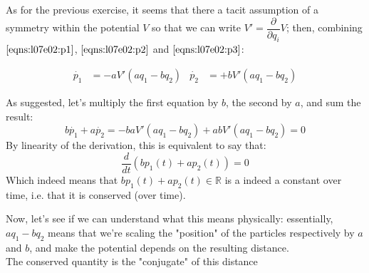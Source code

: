 \documentclass[solutions.tex]{subfiles}
\begin{document}
As for the previous exercise, it seems that there a tacit assumption
of a symmetry within the potential $V$ so that we can write
$V' = \dfrac{\partial}{\partial q_i}V$; then, combining $\eqref{eqns:l07e02:p1}$,
$\eqref{eqns:l07e02:p2}$ and $\eqref{eqns:l07e02:p3}$:

\begin{align*}
	\dot{p_1} &= -aV'(a q_1 - b q_2) &
	\dot{p_2} &= +bV'(a q_1 - b q_2)
\end{align*}

As suggested, let's multiply the first equation by $b$, the second by $a$,
and sum the result:
\[
	b\dot{p_1} + a\dot{p_2} = -baV'(a q_1 - b q_2) +abV'(a q_1 - b q_2) = 0
\]
By linearity of the derivation, this is equivalent to say that:
\[
	\frac{d}{dt}(b p_1(t) + a p_2(t)) = 0
\]
Which indeed means that $b p_1(t) + a p_2(t) \in \mathbb{R}$ is a indeed
a constant over time, i.e. that it is conserved (over time).

\hrr

Now, let's see if we can understand what this means physically: essentially,
$a q_1 - b q_2$ means that we're scaling the "position" of the particles
respectively by $a$ and $b$, and make the potential depends on the resulting
distance. \\

The conserved quantity is the "conjugate" of this distance
\end{document}
